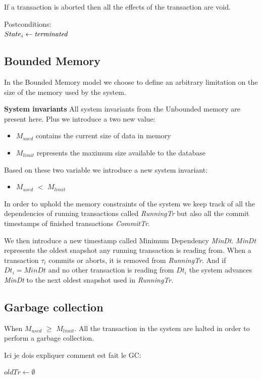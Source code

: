 \documentclass[systeme]{compas2022}
\begin{document}
If a transaction is aborted then all the effects of the transaction are void.

Postconditions:\\
$State_i \leftarrow \emph{terminated}$ \\

\subsection{Bounded Memory}

In the Bounded Memory model we choose to define an arbitrary limitation on the size of the memory used by the system.

\textbf{System invariants}
All system invariants from the Unbounded memory are present here.
Plus we introduce a two new value:
\begin{itemize}
  \item \emph{$M_{used}$} contains the current size of data in memory
  \item \emph{$M_{limit}$} represents the maximum size available to the database
\end{itemize}
Based on these two variable we introduce a new system invariant:
\begin{itemize}
  \item \emph{$M_{used}$} $<$ \emph{$M_{limit}$}
\end{itemize}
In order to uphold the memory constraints of the system we keep track of all the dependencies of running transactions called \emph{RunningTr} but also all the commit timestamps of finished transactions \emph{CommitTr}.

We then introduce a new timestamp called Minimum Dependency \emph{MinDt}.
\emph{MinDt} represents the oldest snapshot any running transaction is reading from.
When a transaction $\tau_i$ commits or aborts, it is removed from \emph{RunningTr}. 
And if $Dt_i = MinDt$ and no other transaction is reading from $Dt_i$ the system advances \emph{MinDt} to the next oldest snapshot used in \emph{RunningTr}.


\subsection{Garbage collection}
When \emph{$M_{used}$} $\geq$ \emph{$M_{limit}$}. 
All the transaction in the system are halted in order to perform a garbage collection.

Ici je dois expliquer comment est fait le GC:\\
\begin{algorithm}
  \(oldTr \longleftarrow \emptyset\)\;
\end{algorithm}
\end{document}
